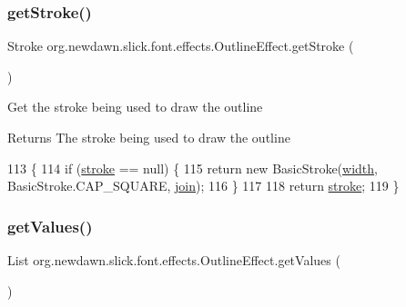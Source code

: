 \subsubsection{\texorpdfstring{get\+Stroke()}{getStroke()}}
{\footnotesize\ttfamily Stroke org.\+newdawn.\+slick.\+font.\+effects.\+Outline\+Effect.\+get\+Stroke (\begin{DoxyParamCaption}{ }\end{DoxyParamCaption})\hspace{0.3cm}{\ttfamily [inline]}}

Get the stroke being used to draw the outline

\begin{DoxyReturn}{Returns}
The stroke being used to draw the outline 
\end{DoxyReturn}

\begin{DoxyCode}
113                               \{
114         \textcolor{keywordflow}{if} (\mbox{\hyperlink{classorg_1_1newdawn_1_1slick_1_1font_1_1effects_1_1_outline_effect_a4a9b2320afee8e246983b063c5cdafe9}{stroke}} == null) \{
115             \textcolor{keywordflow}{return} \textcolor{keyword}{new} BasicStroke(\mbox{\hyperlink{classorg_1_1newdawn_1_1slick_1_1font_1_1effects_1_1_outline_effect_aad96e33c4fb5804e7423df04e1cc1936}{width}}, BasicStroke.CAP\_SQUARE, \mbox{\hyperlink{classorg_1_1newdawn_1_1slick_1_1font_1_1effects_1_1_outline_effect_a913a20571098d37c45f5aff95ff844f9}{join}});
116         \}
117         
118         \textcolor{keywordflow}{return} \mbox{\hyperlink{classorg_1_1newdawn_1_1slick_1_1font_1_1effects_1_1_outline_effect_a4a9b2320afee8e246983b063c5cdafe9}{stroke}};
119     \}
\end{DoxyCode}
\mbox{\label{classorg_1_1newdawn_1_1slick_1_1font_1_1effects_1_1_outline_effect_adbf0ba0c8ddcdc2a53c6a4e8c583fa33}} 
\subsubsection{\texorpdfstring{get\+Values()}{getValues()}}
{\footnotesize\ttfamily List org.\+newdawn.\+slick.\+font.\+effects.\+Outline\+Effect.\+get\+Values (\begin{DoxyParamCaption}{ }\end{DoxyParamCaption})\hspace{0.3cm}{\ttfamily [inline]}}


